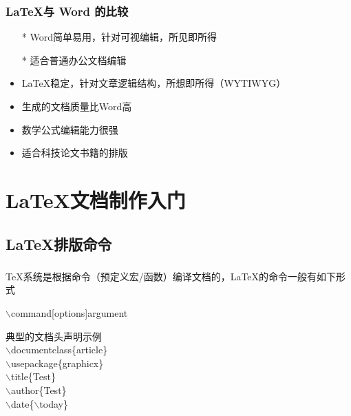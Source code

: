 \documentclass{beamer}
\begin{document}
  \frame
  {
    \frametitle{\LaTeX 与 Word 的比较}
    \begin{itemize}
    \item[*] Word简单易用，针对可视编辑，所见即所得
    \item[*] 适合普通办公文档编辑
    \end{itemize}

    \begin{itemize}
    \item \LaTeX 稳定，针对文章逻辑结构，所想即所得（WYTIWYG）
    \item 生成的文档质量比Word高
    \item 数学公式编辑能力很强
    \item 适合科技论文书籍的排版
    \end{itemize}
  }



  \section{\LaTeX 文档制作入门}

  \subsection{\LaTeX 排版命令}
  \frame
  {
    \frametitle{\subsecname}
    \TeX 系统是根据命令（预定义宏/函数）编译文档的，\LaTeX 的命令一般有如下形式\\
    \begin{center}
    $\backslash$command[options]{argument}
    \end{center}

    典型的文档头声明示例\\
    $\backslash$documentclass\{article\}\\
    $\backslash$usepackage\{graphicx\}\\
    $\backslash$title\{Test\}\\
    $\backslash$author\{Test\}\\
    $\backslash$date\{$\backslash$today\}
  }
\end{document}
